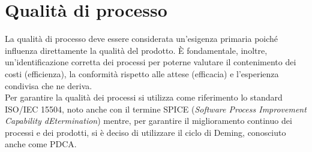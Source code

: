 \section{Qualità di processo}
La qualità di processo deve essere considerata un'esigenza primaria poiché influenza direttamente la qualità del prodotto. È fondamentale, inoltre, un'identificazione corretta dei processi per poterne valutare il contenimento dei costi (efficienza), la conformità rispetto alle attese (efficacia) e l'esperienza condivisa che ne deriva. \\
Per garantire la qualità dei processi si utilizza come riferimento lo standard ISO/IEC 15504, noto anche con il termine SPICE (\textit{Software Process Improvement Capability dEtermination}) mentre, per garantire il miglioramento continuo dei processi e dei prodotti, si è deciso di utilizzare il ciclo di Deming, conosciuto anche come PDCA.



